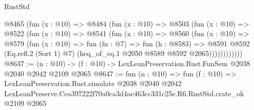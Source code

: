 \begin{lexlean}{RustStd}
\begin{coremodule}
          @8465
            (fun (x : @10) =>
            @8484
              (fun (x : @10) =>
              @8503
                (fun (x : @10) =>
                @8522
                  (fun (x : @10) =>
                  @8541
                    (fun (x : @10) =>
                    @8560
                      (fun (x : @10) =>
                      @8579
                        (fun (x : @10) =>
                        fun (fn : @7) =>
                        fun (h : @8583) =>
                        @8591
                          @8592
                          (Eq.refl.{2} (Sort 1) @7)
                          (heq_of_eq.{1} @2050 @8589 @8592 @2065))))))))))))
@8637 := (n : @10) -> (f : @10) -> LexLeanPreservation.Rust.FunSem @2038 @2040 @2042 @2109 @2065
@8647 := fun (n : @10) =>
  fun (f : @10) =>
  LexLeanPreservation.Rust.simulate
    @2038
    @2040
    @2042
    LexLeanPreserve.Cea397222f70a0ca3d4ae463cc331c25e.R6.RustStd.crate_ok
    @2109
    @2065
\end{coremodule}
\end{lexlean}
